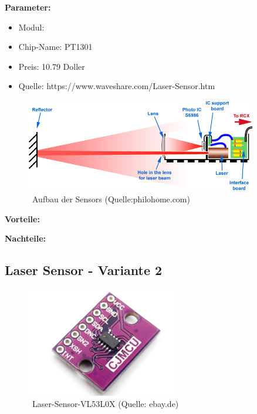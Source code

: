\textbf{Parameter:}  %
\begin{itemize}
\item Modul:
\item Chip-Name: PT1301
\item Preis: 10.79 Doller
\item Quelle: https://www.waveshare.com/Laser-Sensor.htm
\end{itemize}
\begin{figure}[!h]  %
	\centering\includegraphics[width=0.9\textwidth]{images/laser-sensor1.png}
	\caption{ \ Aufbau der Sensors (Quelle:philohome.com)}
	\label{laser-sensor1} %
\end{figure}

\par\bigskip %
\textbf{Vorteile:}  %

\par\bigskip %
\textbf{Nachteile:}  %




\pagebreak

\subsection{Laser Sensor - Variante 2}
\begin{figure}[htbp!]  %
	\centering\includegraphics[width=0.6\textwidth]{images/laser-sensor_v2.png}
	\caption{ \ Laser-Sensor-VL53L0X (Quelle: ebay.de)}
	\label{laser-sensor_v2} %
\end{figure}

